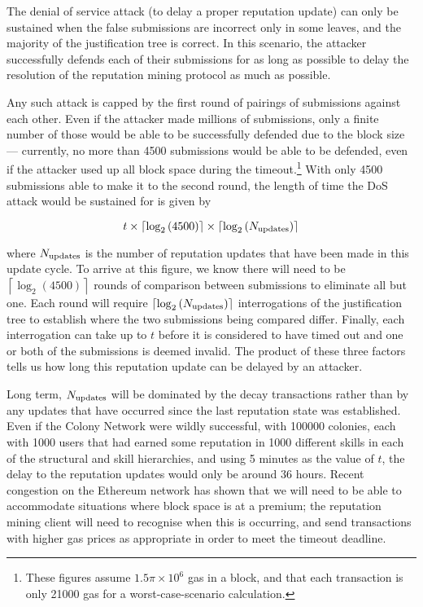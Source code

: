 The denial of service attack (to delay a proper reputation update) can only be sustained when the false submissions are incorrect only in some leaves, and the majority of the justification tree is correct. In this scenario, the attacker successfully defends each of their submissions for as long as possible to delay the resolution of the reputation mining protocol as much as possible.

Any such attack is capped by the first round of pairings of submissions against each other. Even if the attacker made millions of submissions, only a finite number of those would be able to be successfully defended due to the block size --- currently, no more than 4500 submissions would be able to be defended, even if the attacker used up all block space during the timeout.\footnote{These figures assume $1.5\pi\times10^6$ gas in a block, and that each transaction is only 21000 gas for a worst-case-scenario calculation.} With only 4500 submissions able to make it to the second round, the length of time the DoS attack would be sustained for is given by

$$t \times \left\lceil\log_2\left(4500\right)\right\rceil\times \left\lceil\log_2\left(N_{\rm updates}\right)\right\rceil$$

\noindent where $N_{\rm updates}$ is the number of reputation updates that have been made in this update cycle. To arrive at this figure, we know there will need to be $\left\lceil\log_2\left(4500\right)\right\rceil$ rounds of comparison between submissions to eliminate all but one. Each round will require $\left\lceil\log_2\left(N_{\rm updates}\right)\right\rceil$ interrogations of the justification tree to establish where the two submissions being compared differ. Finally, each interrogation can take up to $t$ before it is considered to have timed out and one or both of the submissions is deemed invalid. The product of these three factors tells us how long this reputation update can be delayed by an attacker.

Long term, $N_{\rm updates}$ will be dominated by the decay transactions rather than by any updates that have occurred since the last reputation state was established. Even if the Colony Network were wildly successful, with 100000 colonies, each with 1000 users that had earned some reputation in 1000 different skills in each of the structural and skill hierarchies, and using 5 minutes as the value of $t$, the delay to the reputation updates would only be around $36$ hours. Recent congestion on the Ethereum network has shown that we will need to be able to accommodate situations where block space is at a premium; the reputation mining client will need to recognise when this is occurring, and send transactions with higher gas prices as appropriate in order to meet the timeout deadline.

